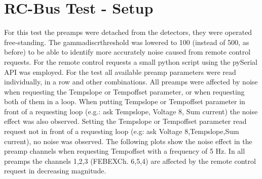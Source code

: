 \documentclass{report}
\begin{document}
\newpage
\clearpage


\section{RC-Bus Test - Setup}
For this test the preamps were detached from the detectors, they were operated free-standing. The gamma\textunderscore discr\textunderscore threshold was lowered to 100  (instead of 500, as before) to be able to identify more accurately noise caused from remote control requests. For the remote control requests a small python script using the pySerial API was employed. For the test all available preamp parameters were read individually, in a row and other combinations. All preamps were affected by noise when requesting the \dq Temp\textunderscore slope \dq{} or \dq Temp\textunderscore offset \dq{} parameter, or when requesting both of them in a loop. When putting \dq Temp\textunderscore slope \dq{} or \dq Temp\textunderscore offset \dq{} parameter in front of a requesting loop (e.g.: ask Temp\textunderscore slope, Voltage 8, Sum current) the noise effect was also observed. Setting the \dq Temp\textunderscore slope\dq{} or \dq Temp\textunderscore offset\dq{} parameter read request not in front of a requesting loop (e.g: ask Voltage 8,Temp\textunderscore slope,Sum current), no noise was observed.\newline
The following plots show the noise effect in the preamp channels  when requesting \dq Temp\textunderscore offset\dq{} with a frequency of 5 Hz. In all preamps the channels 1,2,3 (FEBEXCh. 6,5,4) are affected by the remote control request in decreasing magnitude.\newline
\end{document}

